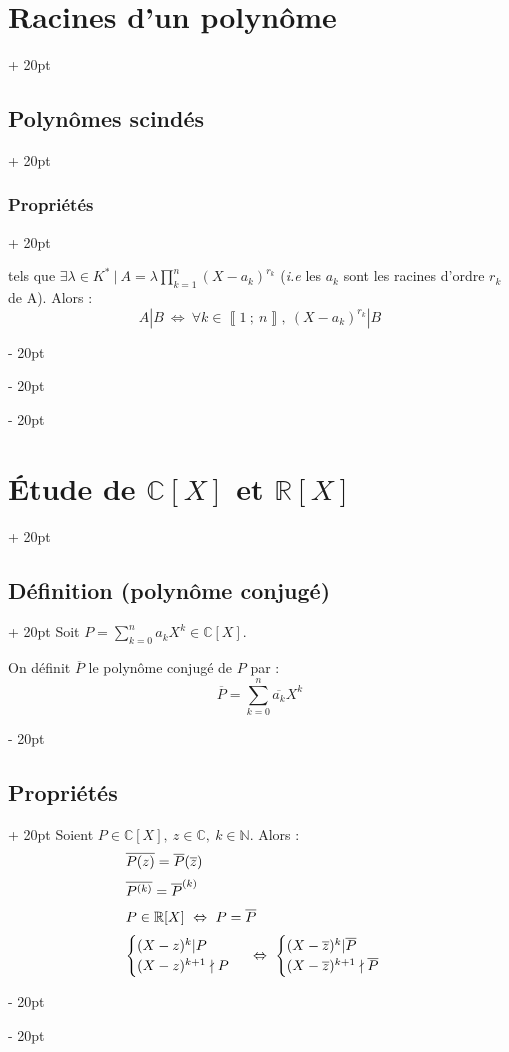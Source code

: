 \documentclass[a4paper, 12pt, twoside]{article}
\newcommand{\N}{\mathbb{N}} %
\newcommand{\R}{\mathbb{R}} %
\newcommand{\C}{\mathbb{C}} %
\newcommand{\nset}[2]{\left\llbracket #1\ ;\ #2 \right\rrbracket}
\newcommand{\cj}[1]{\overline{#1}} %
\newcommand{\ssi}{\ \Leftrightarrow \ }
\newcommand{\eqsys}[2]{\begin{cases} #1 \\ #2 \end{cases}}
\newcommand{\ind}[1][20pt]{\advance\leftskip + #1}
\newcommand{\deind}[1][20pt]{\advance\leftskip - #1}
\newenvironment{indt}[2][20pt]{#2 \par \ind[#1]}{\par \deind} %
\begin{document}
\begin{indt}{\section{Racines d'un polynôme}}
\begin{indt}{\subsection{Polynômes scindés}}
\begin{indt}{\subsubsection{Propriétés}}
                \vspace{6pt}
                
                tels que
                $
                    \displaystyle
                    \exists \lambda \in K^*\ |\ A = \lambda \prod_{k = 1}^n (X - a_k)^{r_k}
                $
                (\textit{i.e} les $a_k$ sont les racines d'ordre $r_k$ de A). Alors :
                    \[ A|B \ssi \forall k \in \nset 1 n,\ (X - a_k)^{r_k} | B \]
            \end{indt}
        \end{indt}
        
    \end{indt}
    
    \vspace{12pt}
    
    \begin{indt}{\section{\'Etude de $\C[X]$ et $\R[X]$}}
        
        \begin{indt}{\subsection{Définition (polynôme conjugé)}}
            Soit $\displaystyle P = \sum_{k = 0}^n a_k X^k \in \C[X]$.
            
            On définit $\cj P$ le polynôme conjugé de $P$ par :
                \[ \cj P = \sum_{k = 0}^n \cj{a_k} X^k \]
        \end{indt}
        
        \vspace{6pt}
        
        \begin{indt}{\subsection{Propriétés}}
            Soient $P \in \C[X],\ z \in \C,\ k \in \N$. Alors :
                \[\begin{array}{l}
                    \cj{P(z)} = \cj{P}(\cj z)
                    \vspace{6pt}
                    \\
                    \cj{P^{(k)}} = \cj{P}^{(k)}
                    \vspace{6pt}
                    \\
                    P \in \R[X] \ssi P = \cj P
                    \vspace{6pt}
                    \\
                    \eqsys{(X - z)^k | P}{(X - z)^{k + 1} \nmid P} \ssi \eqsys{(X - \cj z)^k | \cj P}{(X - \cj z)^{k + 1} \nmid \cj P}
                \end{array}\]
            

\end{indt}
\end{indt}
\end{document}
